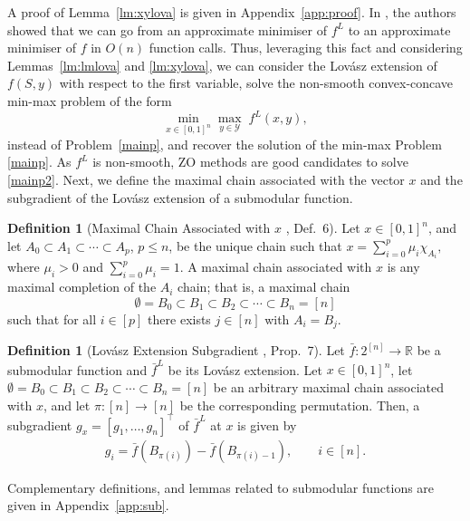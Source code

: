 \documentclass{article}
\theoremstyle{plain}
\theoremstyle{definition}
\newtheorem{definition}[theorem]{Definition}
\theoremstyle{remark}
\begin{document}
A proof of Lemma~\ref{lm:xylova} is given in Appendix~\ref{app:proof}.
In \citep[Lem. 2.2]{axelrod2020near}, %
the authors showed that we can go from an approximate minimiser of $f^L$ to an approximate minimiser of $f$ in $O(n)$ function calls.
Thus, leveraging this fact and considering Lemmas~\ref{lm:lmlova} and \ref{lm:xylova}, we can consider the Lovász extension of $f(S,y)$ with respect to the first variable, solve the non-smooth convex-concave min-max problem of the form
\begin{equation}\label{mainp2}
		\underset{x \in [0,1]^n}{\min}\underset{y \in \mathcal{Y}}{\max}\;f^L(x,y),
\end{equation}
instead of Problem~\eqref{mainp}, and recover the solution of the min-max Problem \eqref{mainp}. 
As $f^L$ is non-smooth, ZO methods are good candidates to solve \eqref{mainp2}. Next, we define the maximal chain associated with the vector $x$ and the subgradient of the Lovász extension of a submodular function.
\begin{definition}[Maximal Chain Associated with $x$ \cite{hazan2012online}, Def.~6]\label{def:maxchain}
Let $x \in [0,1]^n$, and let $A_0 \subset A_1 \subset \cdots \subset A_p$, $p\leq n$, be the unique chain such that 
\(
x = \sum_{i=0}^{p} \mu_i \chi_{A_i},
\)
where $\mu_i > 0$ and $\sum_{i=0}^{p} \mu_i = 1$. 
A maximal chain associated with $x$ is any maximal completion of the $A_i$ chain; that is, 
a maximal chain 
\[
\emptyset = B_0 \subset B_1 \subset B_2 \subset \cdots \subset B_n = [n]
\]
such that for all $i\in [p]$ there exists $j\in [n]$ with %
$A_i=B_j$.
\end{definition}
\begin{definition}[Lovász Extension Subgradient  \cite{hazan2012online}, Prop.~7]\label{def:subg}
    Let $\bar{f}:2^{[n]}\rightarrow \mathbb{R}$ be a submodular function and $\bar{f}^L$ be its Lovász extension. Let $x \in [0,1]^n$, let
    $\emptyset = B_0 \subset B_1 \subset B_2 \subset \cdots \subset B_n = [n]$ be an arbitrary maximal chain associated with $x$, and let $\pi : [n] \to [n]$ be the corresponding permutation. Then, a subgradient $g_x=[g_1,\ldots,g_n]^\top$ of $\bar{f}^L$ %
    at $x$ is given by
\begin{align}\label{eq:subg}
   g_i = \bar{f}(B_{\pi(i)}) - \bar{f}(B_{\pi(i)-1}), \qquad i\in [n]. 
\end{align}
\end{definition}
Complementary definitions, and lemmas related to submodular functions are given in Appendix~\ref{app:sub}.
\end{document}

